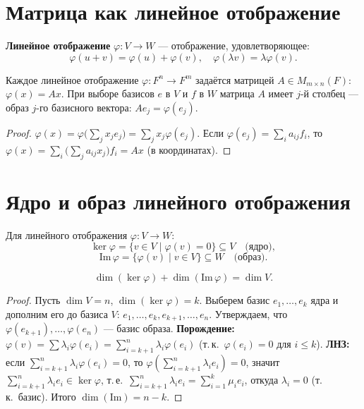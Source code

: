 \documentclass[12pt]{article}
\begin{document}
\section{Матрица как линейное отображение}

\begin{definition}
\textbf{Линейное отображение} $\varphi\colon V \to W$ --- отображение,
удовлетворяющее:
\[
\varphi(u + v) = \varphi(u) + \varphi(v),\quad
\varphi(\lambda v) = \lambda \varphi(v).
\]
\end{definition}

\begin{theorem}
Каждое линейное отображение $\varphi\colon F^n \to F^m$ задаётся
матрицей $A \in M_{m\times n}(F)$: $\varphi(x) = Ax$.
При выборе базисов $e$ в $V$ и $f$ в $W$ матрица $A$ имеет
$j$-й столбец --- образ $j$-го базисного вектора:
$Ae_j = \varphi(e_j)$.
\end{theorem}

\begin{proof}
$\varphi(x) = \varphi\bigl(\sum_j x_j e_j\bigr) = \sum_j x_j \varphi(e_j)$.
Если $\varphi(e_j) = \sum_i a_{ij} f_i$, то
$\varphi(x) = \sum_i \bigl(\sum_j a_{ij} x_j\bigr) f_i = Ax$ (в координатах).
\end{proof}

\section{Ядро и образ линейного отображения}

\begin{definition}
Для линейного отображения $\varphi\colon V \to W$:
\[
\ker\varphi = \{v \in V \mid \varphi(v) = 0\} \subseteq V
\quad\text{(ядро)},
\]
\[
\mathrm{Im}\,\varphi = \{\varphi(v) \mid v \in V\} \subseteq W
\quad\text{(образ)}.
\]
\end{definition}

\begin{theorem}
\[
\dim(\ker\varphi) + \dim(\mathrm{Im}\,\varphi) = \dim V.
\]
\end{theorem}

\begin{proof}
Пусть $\dim V = n$, $\dim(\ker\varphi) = k$.
Выберем базис $e_1,\ldots,e_k$ ядра и дополним его до базиса $V$:
$e_1,\ldots,e_k, e_{k+1},\ldots,e_n$.
Утверждаем, что $\varphi(e_{k+1}),\ldots,\varphi(e_n)$ --- базис образа.
\textbf{Порождение:} $\varphi(v) = \sum \lambda_i \varphi(e_i)
= \sum_{i=k+1}^n \lambda_i \varphi(e_i)$ (т.\,к.\ $\varphi(e_i)=0$
для $i \leq k$).
\textbf{ЛНЗ:} если $\sum_{i=k+1}^n \lambda_i \varphi(e_i) = 0$,
то $\varphi(\sum_{i=k+1}^n \lambda_i e_i) = 0$,
значит $\sum_{i=k+1}^n \lambda_i e_i \in \ker\varphi$,
т.\,е.\ $\sum_{i=k+1}^n \lambda_i e_i = \sum_{i=1}^k \mu_i e_i$,
откуда $\lambda_i = 0$ (т.\,к.\ базис).
Итого $\dim(\mathrm{Im}) = n-k$.
\end{proof}
\end{document}
